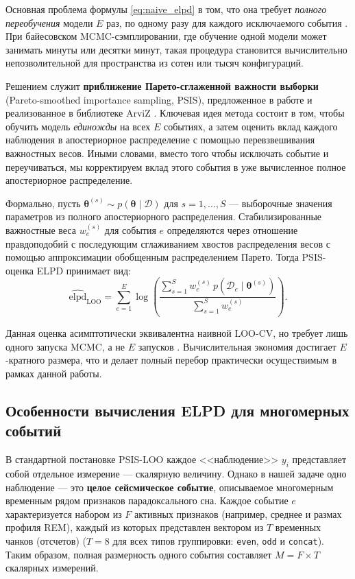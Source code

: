 \documentclass[14pt]{mmcs_article}
\begin{document}
	Основная проблема формулы \eqref{eq:naive_elpd} в том, что она
	требует \textit{полного переобучения} модели $E$ раз, по
	одному разу для каждого исключаемого события
	\cite{Vehtari2017}. При байесовском MCMC-сэмплировании, где
	обучение одной модели может занимать минуты или десятки минут,
	такая процедура становится вычислительно непозволительной для
	пространства из сотен или тысяч конфигураций.
	
	Решением служит \textbf{приближение Парето-сглаженной важности
		выборки} (Pareto-smoothed importance sampling, PSIS),
	предложенное в работе \cite{Vehtari2017} и реализованное в
	библиотеке ArviZ \cite{Kumar2019}. Ключевая идея метода состоит
	в том, чтобы обучить модель \textit{единожды} на всех $E$
	событиях, а затем оценить вклад каждого наблюдения в
	апостериорное распределение с помощью перевзвешивания
	важностных весов. Иными словами, вместо того чтобы исключать
	событие и переучиваться, мы корректируем вклад этого события в
	уже вычисленное полное апостериорное распределение.
	
	Формально, пусть $\boldsymbol{\theta}^{(s)} \sim
	p(\boldsymbol{\theta} \mid \mathcal{D})$ для $s = 1, \dots, S$ —
	выборочные значения параметров из полного апостериорного
	распределения. Стабилизированные важностные веса $w_e^{(s)}$
	для события $e$ определяются через отношение правдоподобий с
	последующим сглаживанием хвостов распределения весов с помощью
	аппроксимации обобщенным распределением Парето. Тогда
	PSIS-оценка ELPD принимает вид:
	\begin{equation}\label{eq:psis_elpd}
		\widehat{\mathrm{elpd}}_{\mathrm{LOO}} = 
		\sum_{e=1}^{E} \log \left( 
		\frac{ \sum_{s=1}^{S} w_e^{(s)} \, 
			p(\mathcal{D}_e \mid \boldsymbol{\theta}^{(s)}) }
		{ \sum_{s=1}^{S} w_e^{(s)} }
		\right).
	\end{equation}
	
	Данная оценка асимптотически эквивалентна наивной LOO-CV, но
	требует лишь одного запуска MCMC, а не $E$ запусков
	\cite{Vehtari2017}. Вычислительная экономия достигает
	$E$-кратного размера, что и делает полный перебор практически
	осуществимым в рамках данной работы.
	
	\subsection*{Особенности вычисления ELPD для многомерных событий}
	
	В стандартной постановке PSIS-LOO каждое <<наблюдение>> $y_i$
	представляет собой отдельное измерение — скалярную величину.
	Однако в нашей задаче одно наблюдение — это \textbf{целое
		сейсмическое событие}, описываемое многомерным временным рядом
	признаков парадоксального сна. Каждое событие $e$
	характеризуется набором из $F$ активных признаков (например,
	среднее и размах профиля REM), каждый из которых представлен
	вектором из $T$ временных чанков (отсчетов) ($T = 8$ для всех типов
	группировки: \texttt{even}, \texttt{odd} и \texttt{concat}).
	Таким образом, полная размерность одного события составляет
	$M = F \times T$ скалярных измерений.
	
\end{document}
